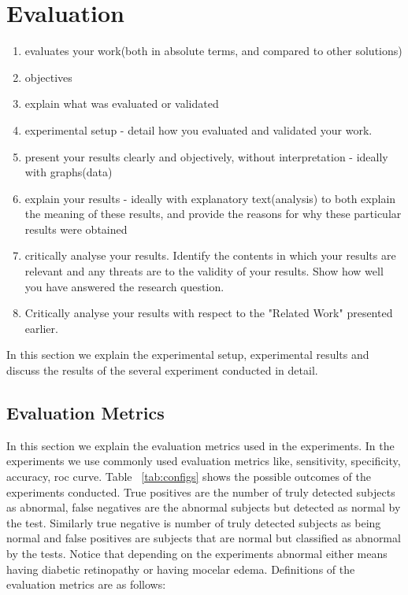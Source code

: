 \chapter{Evaluation}

\begin{enumerate}
    \item evaluates your work(both in absolute terms, and compared to other solutions)
    \item objectives
    \item explain what was evaluated or validated
    \item experimental setup - detail how you evaluated and validated your work.
    \item present your results clearly and objectively, without interpretation - ideally with graphs(data)
    \item explain your results - ideally with explanatory text(analysis) to both explain the meaning of these results, and provide the reasons for why these particular results were obtained
    \item critically analyse your results. Identify the contents in which your results are relevant and any threats are to the validity of your results. Show how well you have answered the research question.
    \item Critically analyse your results with respect to the "Related Work" presented earlier.
\end{enumerate}

In this section we explain the experimental setup, experimental results and discuss the results of the several experiment conducted in detail. 

\section{Evaluation Metrics}
In this section we explain the evaluation metrics used in the experiments. In the experiments we use commonly used evaluation metrics like, sensitivity, specificity, accuracy, roc curve. Table ~\ref{tab:configs} shows the possible outcomes of the experiments conducted. True positives are the number of truly detected subjects as abnormal, false negatives are the abnormal subjects but detected as normal by the test. Similarly true negative is number of truly detected subjects as being normal and false positives are subjects that are normal but classified as abnormal by the tests. Notice that depending on the experiments abnormal either means having diabetic retinopathy or having mocelar edema. Definitions of the evaluation metrics are as follows: 

